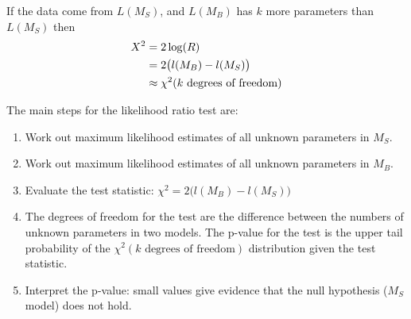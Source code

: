\begin{definition}
	If the data come from $L(M_S)$, and $L(M_B)$ has $k$ more parameters than $L(M_S)$ then
	\begin{align}
		X^2 &= 2\log(R) \notag \\
		&= 2\big(l(M_B) - l(M_S)\big) \notag \\
		&\approx \chi^2(k \text{ degrees of freedom}) \notag
	\end{align}
\end{definition}

The main steps for the likelihood ratio test are:
\begin{enumerate}[label=\textbf{\arabic*.}]
	\item Work out maximum likelihood estimates of all unknown parameters in $M_S$.
	\item Work out maximum likelihood estimates of all unknown parameters in $M_B$.
	\item Evaluate the test statistic: $\chi^2 = 2\big(l(M_B) - l(M_S)\big)$
	\item The degrees of freedom for the test are the difference between the numbers of unknown parameters in two models. The p-value for the test is the upper tail probability of the $\chi^2(k \text{ degrees of freedom})$ distribution given the test statistic.
	\item Interpret the p-value: small values give evidence that the null hypothesis ($M_S$ model) does not hold.
\end{enumerate}

